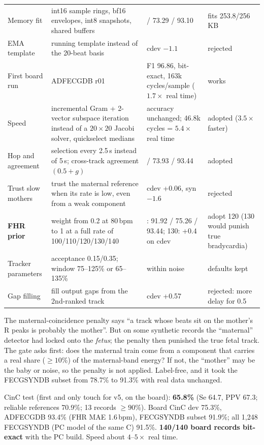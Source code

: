 \documentclass[11pt]{article}
\begin{document}
{\begin{longtable}{@{}>{\raggedright\arraybackslash}p{2.9cm} >{\raggedright\arraybackslash}p{6.0cm} >{\raggedright\arraybackslash}p{3.7cm} >{\raggedright\arraybackslash}p{2.6cm}@{}}
Memory fit & int16 sample rings, bf16 envelopes, int8 snapshots, shared buffers & 91.59 / 73.29 / 93.10 & fits 253.8/256\,KB \\
EMA template & running template instead of the 20-beat basis & cdev $-1.1$ & rejected \\
First board run & ADFECGDB r01 & F1 96.86, bit-exact, 163k cycles/sample ($1.7\times$ real time) & works \\
Speed & incremental Gram + 2-vector subspace iteration instead of a $20\times20$ Jacobi solver, quickselect medians & accuracy unchanged; 46.8k cycles = $5.4\times$ real time & adopted ($3.5\times$ faster) \\
Hop and agreement & selection every 2.5\,s instead of 5\,s; cross-track agreement $(0.5 + g)$ & 91.87 / 73.93 / 93.44 & adopted \\
Trust slow mothers & trust the maternal reference when its rate is low, even from a weak component & cdev +0.06, syn $-1.6$ & rejected \\
\textbf{FHR prior} & weight from 0.2 at 80\,bpm to 1 at a full rate of 100/110/120/130/140 & 120: 91.92 / 75.26 / 93.44; 130: +0.4 on cdev & adopt 120 (130 would punish true bradycardia) \\
Tracker parameters & acceptance 0.15/0.35; window 75--125\% or 65--135\% & within noise & defaults kept \\
Gap filling & fill output gaps from the 2nd-ranked track & cdev +0.57 & rejected: more delay for 0.5 \\
\bottomrule
\end{longtable}
}

\begin{simple}
The maternal-coincidence penalty says ``a track whose beats sit on the mother's R peaks is probably the mother''. But on some synthetic records the ``maternal'' detector had locked onto the \emph{fetus}; the penalty then punished the true fetal track. The gate asks first: does the maternal train come from a component that carries a real share ($\ge 10\%$) of the maternal-band energy? If not, the ``mother'' may be the baby or noise, so the penalty is not applied. Label-free, and it took the FECGSYNDB subset from 78.7\% to 91.3\% with real data unchanged.
\end{simple}

\begin{keyfact}
CinC test (first and only touch for v5, on the board): \textbf{65.8\%} (Se 64.7, PPV 67.3; reliable references 70.9\%; 13 records $\ge 90\%$). Board CinC dev 75.3\%, ADFECGDB 93.4\% (FHR MAE 1.6\,bpm), FECGSYNDB subset 91.9\%; all 1,248 FECGSYNDB (PC model of the same C) 91.5\%. \textbf{140/140 board records bit-exact} with the PC build. Speed about $4$--$5\times$ real time.
\end{keyfact}
\end{document}
